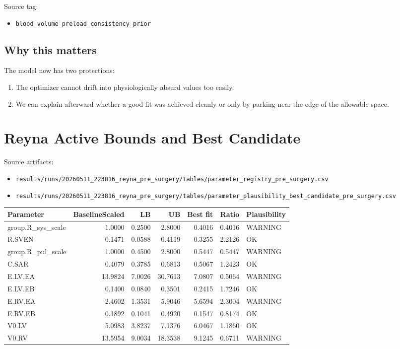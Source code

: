 \documentclass[11pt,a4paper]{article}
\begin{document}
Source tag:

\begin{itemize}[leftmargin=1.5em]
    \item \texttt{blood\_volume\_preload\_consistency\_prior}
\end{itemize}

\subsection{Why this matters}

The model now has two protections:

\begin{enumerate}[leftmargin=1.5em]
    \item The optimizer cannot drift into physiologically absurd values too easily.
    \item We can explain afterward whether a good fit was achieved cleanly or only
    by parking near the edge of the allowable space.
\end{enumerate}

\section{Reyna Active Bounds and Best Candidate}

Source artifacts:

\begin{itemize}[leftmargin=1.5em]
    \item \texttt{results/runs/20260511\_223816\_reyna\_pre\_surgery/tables/parameter\_registry\_pre\_surgery.csv}
    \item \texttt{results/runs/20260511\_223816\_reyna\_pre\_surgery/tables/parameter\_plausibility\_best\_candidate\_pre\_surgery.csv}
\end{itemize}

\begin{longtable}{lrrrrrl}
\toprule
Parameter & BaselineScaled & LB & UB & Best fit & Ratio & Plausibility \\
\midrule
\endhead
group.R\_sys\_scale & 1.0000 & 0.2500 & 2.8000 & 0.4016 & 0.4016 & WARNING \\
R.SVEN & 0.1471 & 0.0588 & 0.4119 & 0.3255 & 2.2126 & OK \\
group.R\_pul\_scale & 1.0000 & 0.4500 & 2.8000 & 0.5447 & 0.5447 & WARNING \\
C.SAR & 0.4079 & 0.3785 & 0.6813 & 0.5067 & 1.2423 & OK \\
E.LV.EA & 13.9824 & 7.0026 & 30.7613 & 7.0807 & 0.5064 & WARNING \\
E.LV.EB & 0.1400 & 0.0840 & 0.3501 & 0.2415 & 1.7246 & OK \\
E.RV.EA & 2.4602 & 1.3531 & 5.9046 & 5.6594 & 2.3004 & WARNING \\
E.RV.EB & 0.1892 & 0.1041 & 0.4920 & 0.1547 & 0.8174 & OK \\
V0.LV & 5.0983 & 3.8237 & 7.1376 & 6.0467 & 1.1860 & OK \\
V0.RV & 13.5954 & 9.0034 & 18.3538 & 9.1245 & 0.6711 & WARNING \\
\bottomrule
\end{longtable}
\end{document}
